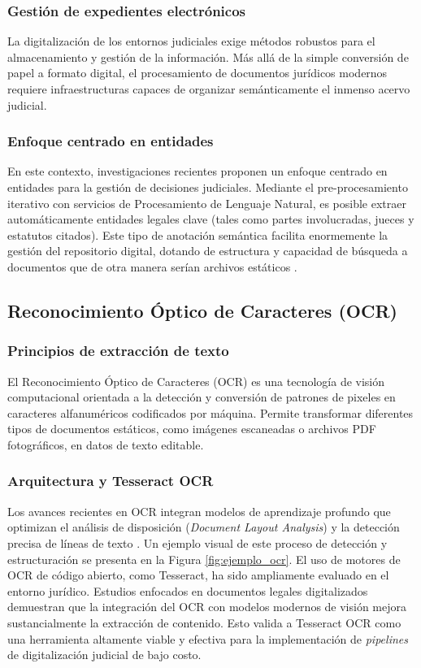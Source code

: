 \subsubsection{Gestión de expedientes electrónicos}
La digitalización de los entornos judiciales exige métodos robustos para el almacenamiento y gestión de la información. Más allá de la simple conversión de papel a formato digital, el procesamiento de documentos jurídicos modernos requiere infraestructuras capaces de organizar semánticamente el inmenso acervo judicial.

\subsubsection{Enfoque centrado en entidades}
En este contexto, investigaciones recientes proponen un enfoque centrado en entidades para la gestión de decisiones judiciales. Mediante el pre-procesamiento iterativo con servicios de Procesamiento de Lenguaje Natural, es posible extraer automáticamente entidades legales clave (tales como partes involucradas, jueces y estatutos citados). Este tipo de anotación semántica facilita enormemente la gestión del repositorio digital, dotando de estructura y capacidad de búsqueda a documentos que de otra manera serían archivos estáticos \cite{Bellandi2024}.

\subsection{Reconocimiento Óptico de Caracteres (OCR)}

\subsubsection{Principios de extracción de texto}
El Reconocimiento Óptico de Caracteres (OCR) es una tecnología de visión computacional orientada a la detección y conversión de patrones de pixeles en caracteres alfanuméricos codificados por máquina. Permite transformar diferentes tipos de documentos estáticos, como imágenes escaneadas o archivos PDF fotográficos, en datos de texto editable.

\subsubsection{Arquitectura y Tesseract OCR}
Los avances recientes en OCR integran modelos de aprendizaje profundo que optimizan el análisis de disposición (\textit{Document Layout Analysis}) y la detección precisa de líneas de texto \cite{Fateh2024}. Un ejemplo visual de este proceso de detección y estructuración se presenta en la Figura \ref{fig:ejemplo_ocr}. El uso de motores de OCR de código abierto, como Tesseract, ha sido ampliamente evaluado en el entorno jurídico. Estudios enfocados en documentos legales digitalizados demuestran que la integración del OCR con modelos modernos de visión mejora sustancialmente la extracción de contenido. Esto valida a Tesseract OCR como una herramienta altamente viable y efectiva para la implementación de \textit{pipelines} de digitalización judicial de bajo costo.

